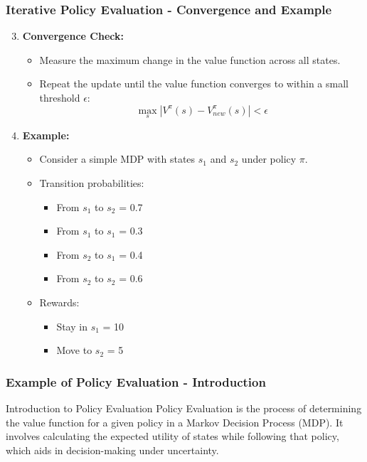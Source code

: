 \documentclass[aspectratio=169]{beamer}
\begin{document}
\begin{frame}[fragile]
    \frametitle{Iterative Policy Evaluation - Convergence and Example}
    \begin{enumerate}
        \setcounter{enumi}{2}
        \item \textbf{Convergence Check:}
            \begin{itemize}
                \item Measure the maximum change in the value function across all states.
                \item Repeat the update until the value function converges to within a small threshold \( \epsilon \):
                \[
                \max_{s} |V^{\pi}(s) - V^{\pi}_{new}(s)| < \epsilon
                \]
            \end{itemize}

        \item \textbf{Example:}
            \begin{itemize}
                \item Consider a simple MDP with states \( s_1 \) and \( s_2 \) under policy \( \pi \).
                \item Transition probabilities:
                    \begin{itemize}
                        \item From \( s_1 \) to \( s_2 \) = 0.7
                        \item From \( s_1 \) to \( s_1 \) = 0.3
                        \item From \( s_2 \) to \( s_1 \) = 0.4
                        \item From \( s_2 \) to \( s_2 \) = 0.6
                    \end{itemize}
                \item Rewards:
                    \begin{itemize}
                        \item Stay in \( s_1 \) = 10
                        \item Move to \( s_2 \) = 5
                    \end{itemize}
            \end{itemize}
    \end{enumerate}
\end{frame}

\begin{frame}[fragile]
    \frametitle{Example of Policy Evaluation - Introduction}
    \begin{block}{Introduction to Policy Evaluation}
        Policy Evaluation is the process of determining the value function for a given policy in a Markov Decision Process (MDP). It involves calculating the expected utility of states while following that policy, which aids in decision-making under uncertainty.
    \end{block}
\end{frame}
\end{document}

